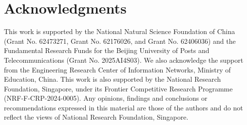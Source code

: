 \documentclass{article}
\theoremstyle{plain}
\theoremstyle{definition}
\theoremstyle{remark}
\begin{document}







\section*{Acknowledgments}
This work is supported by the National Natural Science Foundation of China (Grant No. 62473271, Grant No. 62176026, and Grant No. 62406036) and the Fundamental Research Funds for the Beijing University of Posts and Telecommunications (Grant No. 2025AI4S03). We also acknowledge the support from the Engineering Research Center of Information Networks, Ministry of Education, China. This work is also supported by the National Research Foundation, Singapore, under its Frontier Competitive Research Programme (NRF-F-CRP-2024-0005). Any opinions, findings and conclusions or recommendations expressed in this material are those of the authors and do not reflect the views of National Research Foundation, Singapore.
\end{document}
